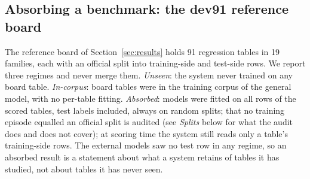 \subsection{Absorbing a benchmark: the dev91 reference board}
\label{sec:blackhole-dev91}

The reference board of Section~\ref{sec:results} holds 91 regression tables in 19 families, each with an official
split into training-side and test-side rows. We report three regimes and never merge them. \emph{Unseen}: the system
never trained on any board table. \emph{In-corpus}: board tables were in the training corpus of the general model,
with no per-table fitting. \emph{Absorbed}: models were fitted on all rows of the scored tables, test labels
included, always on random splits; that no training episode equalled an official split is audited (see
\emph{Splits} below for what the audit does and does not cover); at scoring time the system still reads only a
table's training-side rows. The external models saw no test row in any regime, so an absorbed result is a statement
about what a system retains of tables it has studied, not about tables it has never seen.

